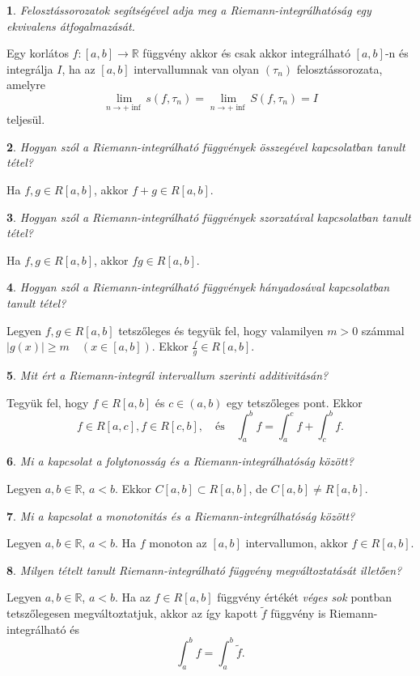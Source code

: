 \documentclass[a4paper]{article}
\def\R{\mathbb{R}}
\theoremstyle{qstyle}
\newtheorem{question}{}{}
\begin{document}
	\begin{question}
		Felosztássorozatok segítségével adja meg a Riemann-integrálhatóság egy ekvivalens
		átfogalmazását.  
	\end{question}
	Egy korlátos $f : [a,b] \to \R$ függvény akkor és csak akkor integrálható $[a,b]$-n és integrálja $I$, ha az $[a,b]$ intervallumnak van olyan $(\tau_{n})$ felosztássorozata, amelyre
	$$
	\lim\limits_{n \to +\inf} s(f,\tau_{n}) = \lim\limits_{n \to +\inf} S(f,\tau_{n}) = I	
	$$
	teljesül.
	
	\begin{question}
		Hogyan szól a Riemann-integrálható függvények összegével kapcsolatban tanult tétel?
	\end{question}
	Ha $f, g \in R[a,b]$, akkor $f + g \in R[a,b]$.
	
	\begin{question}
		Hogyan szól a Riemann-integrálható függvények szorzatával kapcsolatban tanult tétel?
	\end{question}
	Ha $f, g \in R[a,b]$, akkor $fg \in R[a,b]$.
	
	\begin{question}
		Hogyan szól a Riemann-integrálható függvények hányadosával kapcsolatban tanult tétel?
	\end{question}
	Legyen $f, g \in R[a,b]$ tetszőleges és tegyük fel, hogy valamilyen $m > 0$ számmal $|g(x)| \ge m \quad (x \in [a,b])$. Ekkor $\frac{f}{g} \in R[a,b]$.
	
	\begin{question}
		Mit ért a Riemann-integrál intervallum szerinti additivitásán?
	\end{question}
	Tegyük fel, hogy $f \in R[a,b]$ és $c \in (a,b)$ egy tetszőleges pont. Ekkor
	$$
	f \in R[a,c], f \in R[c,b], \quad \text{és} \quad \int_{a}^{b} f = \int_{a}^{c} f + \int_{c}^{b} f \text{.}
	$$
	
	\begin{question}
		Mi a kapcsolat a folytonosság és a Riemann-integrálhatóság között?
	\end{question}
	Legyen $a,b \in \R$, $a < b$. Ekkor $C[a,b] \subset R[a,b]$, de $C[a,b] \ne R[a,b]$.
	
	\begin{question}
		Mi a kapcsolat a monotonitás és a Riemann-integrálhatóság között?
	\end{question}
	Legyen $a,b \in \R$, $a < b$. Ha $f$ monoton az $[a,b]$ intervallumon, akkor $f \in R[a,b]$.
	
	\begin{question}
		Milyen tételt tanult Riemann-integrálható függvény megváltoztatását illetően? 
	\end{question}
	Legyen $a,b \in \R$, $a < b$. Ha az $f \in R[a,b]$ függvény értékét \emph{véges sok} pontban tetszőlegesen megváltoztatjuk, akkor az így kapott $\widetilde{f}$ függvény is Riemann-integrálható és 
	$$\int_{a}^{b} f = \int_{a}^{b} \widetilde{f} \text{.}$$
	
\end{document}
